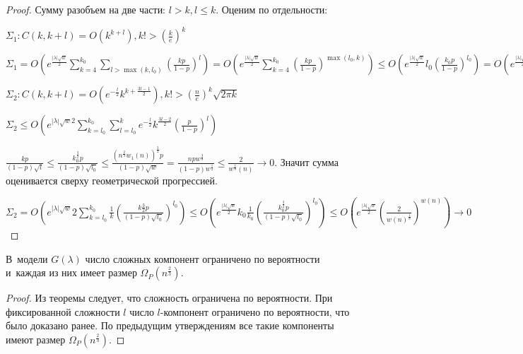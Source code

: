 \documentclass{article}
\begin{document}
\begin{proof}
	Сумму разобъем на две части: $l > k, l \le k$. Оценим по отдельности:

	$\Sigma_1: C(k, k + l) = O(k^{k+l}), k! > \left(\frac{k}{e}\right)^k$

	$\Sigma_1 = O\left( e^\frac{|\lambda|\sqrt{w}}{2} \sum\limits_{k=4}^{k_0} \sum\limits_{l > \max(k,
	l_0)} \left( \frac{kp}{1 - p} \right)^l \right) = O\left( e^\frac{|\lambda|\sqrt{w}}{2}
	\sum\limits_{k=4}^{k_0} \left( \frac{kp}{1-p} \right)^{\max(l_0, k)} \right) \le O\left(
	e^\frac{|\lambda|\sqrt{w}}{2} l_0 \left( \frac{k_0 p}{1 - p} \right)^{l_0} \right) = O\left(
	e^\frac{|\lambda|\sqrt{w}}{2} w(n) (2n^{-\frac{\delta}{4}})^{w(n)}\right) \rightarrow 0$

	$\Sigma_2: C(k, k + l) = O(e^{-\frac{l}{2}} k^{k+\frac{3l-1}{2}}), k! > \left(\frac{n}{e}\right)^k
	\sqrt{2\pi k}$

	$\Sigma_2 \le O\left(e^{|\lambda|\sqrt{w}{2}} \sum\limits_{k=l_0}^{k_0} \sum\limits_{l=l_0}^k
	e^{-\frac{l}{2}} k^\frac{3l-2}{2} \left(\frac{p}{1-p}\right)^l \right)$

	$\frac{kp}{(1-p)\sqrt{l}} \le \frac{k_0^\frac{3}{2} p}{(1 - p)\sqrt{l_0}} \le \frac{(n^\frac{2}{3}
	w_1(n))^\frac{3}{2} p}{(1 - p) \sqrt{w}} = \frac{np w^\frac{3}{8}}{(1-p)w^\frac{1}{2}} \le
	\frac{2}{w^\frac{1}{8}(n)} \rightarrow 0$. Значит сумма оценивается сверху геометрической
	прогрессией.

	$\Sigma_2 = O\left( e^{|\lambda|\sqrt{w}}{2} \sum\limits_{k=l_0}^{k_0} \frac{1}{k} \left(
	\frac{k\frac{3}{2}p}{(1-p)\sqrt{l_0}}\right)^{l_0} \right) \le
	O\left(e^\frac{|\lambda|\sqrt{w}}{2} k_0 \frac{1}{k_0} \left(\frac{k_0^\frac{3}{2}
	p}{(1-p)\sqrt{l_0}}\right)^{l_0} \right) \le O\left(e^\frac{|\lambda|\sqrt{w}}{2}
	\left(\frac{2}{w(n)^\frac{1}{8}}\right)^{w(n)} \right) \rightarrow 0$
\end{proof}

\begin{corollary}
	В~модели $G(\lambda)$ число сложных компонент ограничено по вероятности и~каждая из них имеет
	размер $\Omega_P(n^\frac{2}{3})$.
\end{corollary}
\begin{proof}
	Из теоремы следует, что сложность ограничена по вероятности. При фиксированной сложности $l$ число
	$l$-компонент ограничено по вероятности, что было доказано ранее. По предыдущим утверждениям все
	такие компоненты имеют размер $\Omega_P(n^\frac{2}{3})$.
\end{proof}
\end{document}
